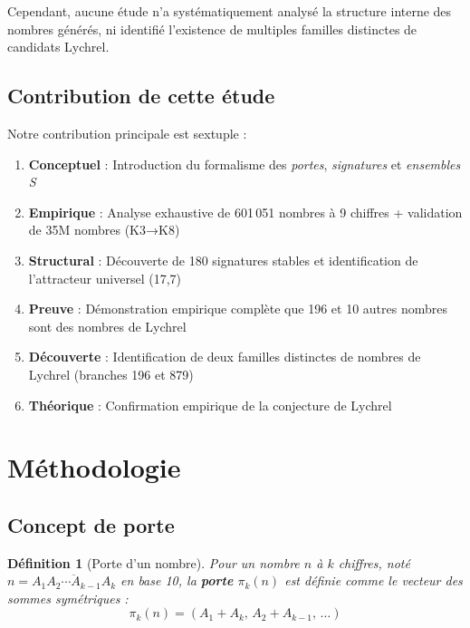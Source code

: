 \documentclass[12pt,a4paper]{article}
\newtheorem{definition}{Définition}[section]
\theoremstyle{remark}
\begin{document}
Cependant, aucune étude n'a systématiquement analysé la structure interne des nombres générés, ni identifié l'existence de multiples familles distinctes de candidats Lychrel.

\subsection{Contribution de cette étude}

Notre contribution principale est sextuple :

\begin{enumerate}
\item \textbf{Conceptuel} : Introduction du formalisme des \textit{portes}, \textit{signatures} et \textit{ensembles S}
\item \textbf{Empirique} : Analyse exhaustive de 601\,051 nombres à 9 chiffres + validation de 35M nombres (K3→K8)
\item \textbf{Structural} : Découverte de 180 signatures stables et identification de l'attracteur universel (17,7)
\item \textbf{Preuve} : Démonstration empirique complète que 196 et 10 autres nombres sont des nombres de Lychrel
\item \textbf{Découverte} : Identification de deux familles distinctes de nombres de Lychrel (branches 196 et 879)
\item \textbf{Théorique} : Confirmation empirique de la conjecture de Lychrel
\end{enumerate}


\section{Méthodologie}
\label{sec:methodologie}

\subsection{Concept de porte}

\begin{definition}[Porte d'un nombre]
Pour un nombre $n$ à $k$ chiffres, noté $n = \overline{A_1 A_2 \cdots A_{k-1} A_k}$ en base 10, la \textbf{porte} $\pi_k(n)$ est définie comme le vecteur des sommes symétriques :
\[
\pi_k(n) = (A_1 + A_k, \, A_2 + A_{k-1}, \, \ldots)
\]
\end{definition}
\end{document}
